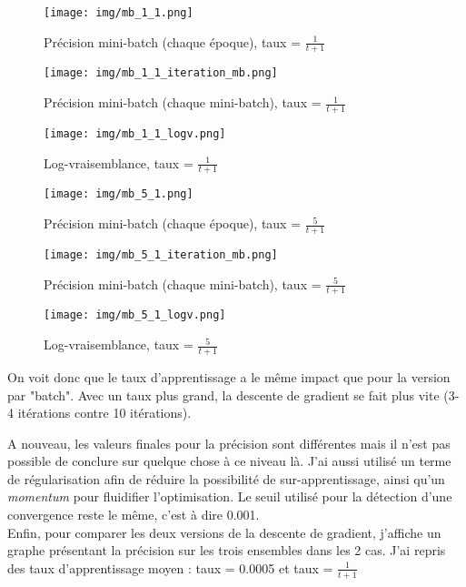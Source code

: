 \documentclass[12pt]{article}
\begin{document}
\begin{figure}[H]
\begin{center}
	\texttt{[image: img/mb\_1\_1.png]}
	\caption{Précision mini-batch (chaque époque), taux = $\frac{1}{t+1}$}
\end{center}
\end{figure}
\begin{figure}[H]
\begin{center}
	\texttt{[image: img/mb\_1\_1\_iteration\_mb.png]}
	\caption{Précision mini-batch (chaque mini-batch), taux = $\frac{1}{t+1}$}
\end{center}
\end{figure}
\begin{figure}[H]
\begin{center}
	\texttt{[image: img/mb\_1\_1\_logv.png]}
	\caption{Log-vraisemblance, taux = $\frac{1}{t+1}$}
\end{center}
\end{figure}
\begin{figure}[H]
\begin{center}
	\texttt{[image: img/mb\_5\_1.png]}
	\caption{Précision mini-batch (chaque époque), taux = $\frac{5}{t+1}$}
\end{center}
\end{figure}
\begin{figure}[H]
\begin{center}
	\texttt{[image: img/mb\_5\_1\_iteration\_mb.png]}
	\caption{Précision mini-batch (chaque mini-batch), taux = $\frac{5}{t+1}$}
\end{center}
\end{figure}
\begin{figure}[H]
\begin{center}
	\texttt{[image: img/mb\_5\_1\_logv.png]}
	\caption{Log-vraisemblance, taux = $\frac{5}{t+1}$}
\end{center}
\end{figure}


On voit donc que le taux d'apprentissage a le même impact que pour la version par "batch". Avec un taux plus grand, la descente de gradient se fait plus vite (3-4 itérations contre 10 itérations).

A nouveau, les valeurs finales pour la précision sont différentes mais il n'est pas possible de conclure sur quelque chose à ce niveau là. J'ai aussi utilisé un terme de régularisation afin de réduire la possibilité de sur-apprentissage, ainsi qu'un \textit{momentum} pour fluidifier l'optimisation. Le seuil utilisé pour la détection d'une convergence reste le même, c'est à dire 0.001. 
\\ \linebreak
Enfin, pour comparer les deux versions de la descente de gradient, j'affiche un graphe présentant la précision sur les trois ensembles dans les 2 cas. J'ai repris des taux d'apprentissage moyen : taux = 0.0005 et taux = $\frac{1}{t+1}$
\end{document}
